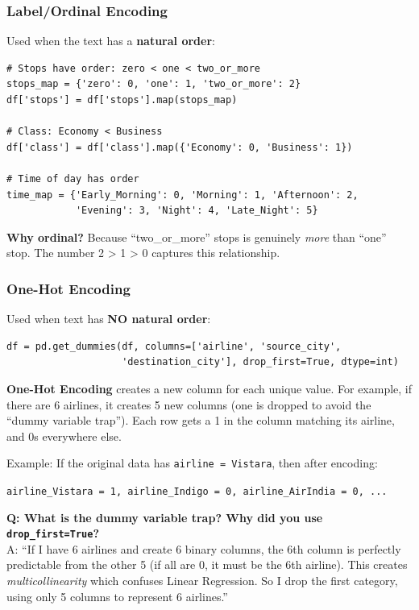 \documentclass[12pt, a4paper]{article}
\begin{document}
\subsubsection{Label/Ordinal Encoding}
Used when the text has a \textbf{natural order}:
\begin{lstlisting}
# Stops have order: zero < one < two_or_more
stops_map = {'zero': 0, 'one': 1, 'two_or_more': 2}
df['stops'] = df['stops'].map(stops_map)

# Class: Economy < Business
df['class'] = df['class'].map({'Economy': 0, 'Business': 1})

# Time of day has order
time_map = {'Early_Morning': 0, 'Morning': 1, 'Afternoon': 2,
            'Evening': 3, 'Night': 4, 'Late_Night': 5}
\end{lstlisting}

\textbf{Why ordinal?} Because ``two\_or\_more'' stops is genuinely \textit{more} than ``one'' stop. The number 2 > 1 > 0 captures this relationship.

\subsubsection{One-Hot Encoding}
Used when text has \textbf{NO natural order}:
\begin{lstlisting}
df = pd.get_dummies(df, columns=['airline', 'source_city',
                    'destination_city'], drop_first=True, dtype=int)
\end{lstlisting}

\begin{conceptbox}
    \textbf{One-Hot Encoding} creates a new column for each unique value. For example, if there are 6 airlines, it creates 5 new columns (one is dropped to avoid the ``dummy variable trap''). Each row gets a 1 in the column matching its airline, and 0s everywhere else.

    \vspace{0.3cm}
    Example: If the original data has \texttt{airline = Vistara}, then after encoding:

    \vspace{0.2cm}
    \texttt{airline\_Vistara = 1, airline\_Indigo = 0, airline\_AirIndia = 0, ...}
\end{conceptbox}

\begin{warnbox}
    \textbf{Q: What is the dummy variable trap? Why did you use \texttt{drop\_first=True}?} \\
    A: ``If I have 6 airlines and create 6 binary columns, the 6th column is perfectly predictable from the other 5 (if all are 0, it must be the 6th airline). This creates \textit{multicollinearity} which confuses Linear Regression. So I drop the first category, using only 5 columns to represent 6 airlines.''
\end{warnbox}
\end{document}
